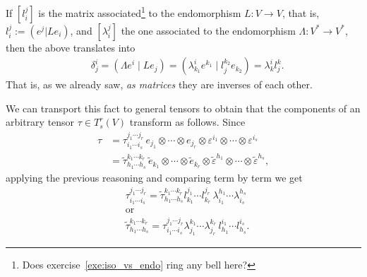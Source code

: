 If $[l_i^j]$ is the matrix associated\footnote{Does exercise~\ref{exe:iso_vs_endo} ring any bell here?} to the endomorphism $L: V \to V$, that is, $l_i^j := (e^j | L e_i)$, and $[\lambda_i^j]$ the one associated to the endomorphism $\Lambda: V^* \to V^*$, then the above translates into
\begin{align}
	 & \delta_j^i = (\Lambda e^i \mid L e_j) = (\lambda_{k_1}^i e^{k_1} \mid l_j^{k_2} e_{k_2}) = \lambda_k^i l_j^k.
\end{align}
That is, as we already saw, \emph{as matrices} they are inverses of each other.

We can transport this fact to general tensors to obtain that the components of an arbitrary tensor $\tau\in T^r_s(V)$ transform as follows.
Since
\begin{align}
	\tau
	 & =
	\tau^{j_1\cdots j_r}_{i_1\cdots i_s} \, e_{j_1}\otimes\cdots\otimes e_{j_r}\otimes \varepsilon^{i_1}\otimes \cdots\otimes \varepsilon^{i_s}                                                           \\
	 & = \widetilde\tau^{k_1\cdots k_r}_{h_1\cdots h_s} \, \widetilde e_{k_1}\otimes\cdots\otimes \widetilde e_{k_r}\otimes \widetilde\varepsilon^{h_1}\otimes \cdots\otimes \widetilde\varepsilon^{h_s},
\end{align}
applying the previous reasoning and comparing term by term we get
\begin{align}
	 & \tau^{j_1\cdots j_r}_{i_1\cdots i_s} = \widetilde\tau^{k_1\cdots k_r}_{h_1\cdots h_s} l_{k_1}^{j_1}\cdots l_{k_r}^{j_r}\, \lambda_{i_1}^{h_1}\cdots \lambda_{i_s}^{h_s}  \\
	 & \mbox{or}                                                                                                                                                                \\
	 & \widetilde\tau^{k_1\cdots k_r}_{h_1\cdots h_s} = \tau^{j_1\cdots j_r}_{i_1\cdots i_s} \lambda_{j_1}^{k_1}\cdots \lambda_{j_r}^{k_r}\, l_{h_1}^{i_1}\cdots l_{h_s}^{i_s}.
\end{align}

